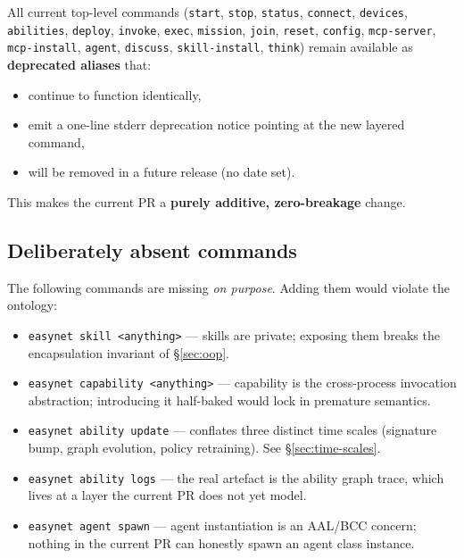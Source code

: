 \documentclass[11pt,a4paper]{article}
\begin{document}
All current top-level commands (\texttt{start}, \texttt{stop}, \texttt{status},
\texttt{connect}, \texttt{devices}, \texttt{abilities}, \texttt{deploy},
\texttt{invoke}, \texttt{exec}, \texttt{mission}, \texttt{join}, \texttt{reset},
\texttt{config}, \texttt{mcp-server}, \texttt{mcp-install}, \texttt{agent},
\texttt{discuss}, \texttt{skill-install}, \texttt{think}) remain available as
\textbf{deprecated aliases} that:

\begin{itemize}[leftmargin=2em,itemsep=0.2em]
    \item continue to function identically,
    \item emit a one-line stderr deprecation notice pointing at the new
    layered command,
    \item will be removed in a future release (no date set).
\end{itemize}

This makes the current PR a \textbf{purely additive, zero-breakage} change.

\subsection{Deliberately absent commands}

The following commands are missing \emph{on purpose}. Adding them would
violate the ontology:

\begin{itemize}[leftmargin=2em,itemsep=0.35em]
    \item \texttt{easynet skill <anything>} --- skills are private; exposing
    them breaks the encapsulation invariant of \S\ref{sec:oop}.

    \item \texttt{easynet capability <anything>} --- capability is the
    cross-process invocation abstraction; introducing it half-baked would
    lock in premature semantics.

    \item \texttt{easynet ability update} --- conflates three distinct time
    scales (signature bump, graph evolution, policy retraining). See
    \S\ref{sec:time-scales}.

    \item \texttt{easynet ability logs} --- the real artefact is the ability
    graph trace, which lives at a layer the current PR does not yet model.

    \item \texttt{easynet agent spawn} --- agent instantiation is an AAL/BCC
    concern; nothing in the current PR can honestly spawn an agent class
    instance.
\end{itemize}
\end{document}
